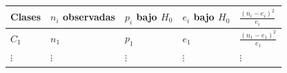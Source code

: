\documentclass[
]{book}
\theoremstyle{break}
\theoremstyle{definition}
\theoremstyle{definition}
\theoremstyle{definition}
\theoremstyle{remark}
\begin{document}
\begin{longtable}[]{@{}lllll@{}}
\toprule
\begin{minipage}[b]{0.06\columnwidth}\raggedright
Clases\strut
\end{minipage} & \begin{minipage}[b]{0.17\columnwidth}\raggedright
\(n_{i}\) observadas\strut
\end{minipage} & \begin{minipage}[b]{0.17\columnwidth}\raggedright
\(p_{i}\) bajo \(H_0\)\strut
\end{minipage} & \begin{minipage}[b]{0.17\columnwidth}\raggedright
\(e_{i}\) bajo \(H_0\)\strut
\end{minipage} & \begin{minipage}[b]{0.29\columnwidth}\raggedright
\(\frac{(n_{i}-e_{i})^2}{e_{i}}\)\strut
\end{minipage}\tabularnewline
\midrule
\endhead
\begin{minipage}[t]{0.06\columnwidth}\raggedright
\(C_1\)\strut
\end{minipage} & \begin{minipage}[t]{0.17\columnwidth}\raggedright
\(n_1\)\strut
\end{minipage} & \begin{minipage}[t]{0.17\columnwidth}\raggedright
\(p_1\)\strut
\end{minipage} & \begin{minipage}[t]{0.17\columnwidth}\raggedright
\(e_1\)\strut
\end{minipage} & \begin{minipage}[t]{0.29\columnwidth}\raggedright
\(\frac{(n_1-e_1)^2}{e_1}\)\strut
\end{minipage}\tabularnewline
\begin{minipage}[t]{0.06\columnwidth}\raggedright
\(\vdots\)\strut
\end{minipage} & \begin{minipage}[t]{0.17\columnwidth}\raggedright
\(\vdots\)\strut
\end{minipage} & \begin{minipage}[t]{0.17\columnwidth}\raggedright
\(\vdots\)\strut
\end{minipage} & \begin{minipage}[t]{0.17\columnwidth}\raggedright
\(\vdots\)\strut
\end{minipage} & \begin{minipage}[t]{0.29\columnwidth}\raggedright
\(\vdots\)\strut
\end{minipage}\tabularnewline

\end{longtable}
\end{document}
